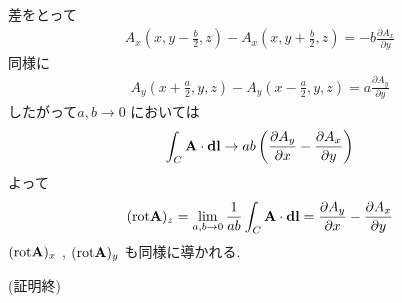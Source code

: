 \documentclass[../main]{subfiles}
\begin{document}
差をとって
\begin{eqnarray}
A_x(x,y-\frac{b}{2},z)-A_x(x,y+\frac{b}{2},z) = -b \frac{\partial A_x}{\partial y}
\end{eqnarray}
同様に
\begin{eqnarray}
A_y(x+\frac{a}{2},y,z)-A_y(x-\frac{a}{2},y,z) = a \frac{\partial A_y}{\partial y}
\end{eqnarray}
したがって$a,b \to 0$ においては
\begin{eqnarray}
\int_{C}^{} {\bf A} \cdot {\bf dl} \to ab \left( \frac{\partial A_y}{\partial x} - \frac{\partial A_x}{\partial y} \right)
\end{eqnarray}
よって
\begin{eqnarray}
({\rm rot} {\bf A})_z = \lim_{a,b \to 0} \frac{1}{ab} \int_{C}^{} {\bf A} \cdot {\bf dl} =\frac{\partial A_y}{\partial x} - \frac{\partial A_x}{\partial y}
\end{eqnarray}
$({\rm rot} {\bf A})_x$ , $({\rm rot} {\bf A})_y$ も同様に導かれる.
\begin{flushright}
(証明終)
\end{flushright}
\end{document}
